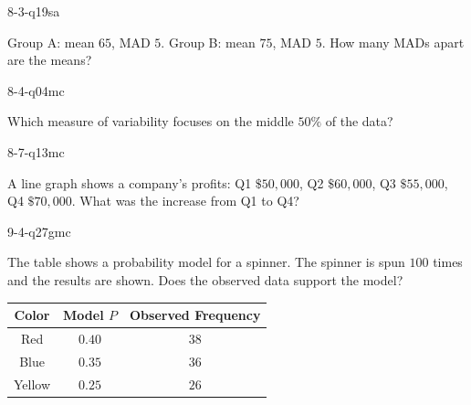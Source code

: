 \begin{practiceQuestion}{8-3-q19}{sa}
\begin{questionText}
Group A: mean $65$, MAD $5$. Group B: mean $75$, MAD $5$. How many MADs apart are the means?
\end{questionText}
\end{practiceQuestion}

\begin{practiceQuestion}{8-4-q04}{mc}
\begin{questionText}
Which measure of variability focuses on the middle $50\%$ of the data?
\end{questionText}
\end{practiceQuestion}

\begin{practiceQuestion}{8-7-q13}{mc}
\begin{questionText}
A line graph shows a company's profits: Q1 $\$50{,}000$, Q2 $\$60{,}000$, Q3 $\$55{,}000$, Q4 $\$70{,}000$. What was the increase from Q1 to Q4?
\end{questionText}
\end{practiceQuestion}

\begin{practiceQuestion}{9-4-q27}{gmc}
\begin{questionText}
The table shows a probability model for a spinner. The spinner is spun $100$ times and the results are shown. Does the observed data support the model?

\begin{center}
\begin{tabular}{|c|c|c|}
\hline
\textbf{Color} & \textbf{Model $P$} & \textbf{Observed Frequency} \\
\hline
Red & $0.40$ & $38$ \\
\hline
Blue & $0.35$ & $36$ \\
\hline
Yellow & $0.25$ & $26$ \\
\hline
\end{tabular}
\end{center}
\end{questionText}
\end{practiceQuestion}

